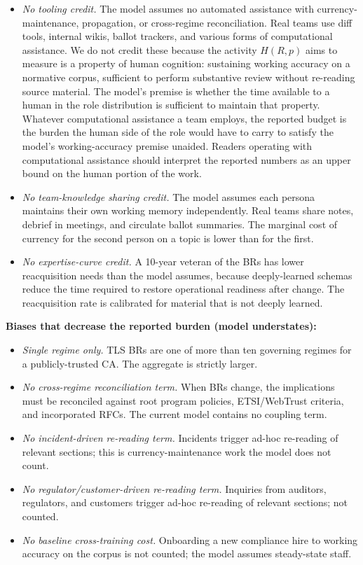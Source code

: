 \documentclass[11pt,letterpaper]{article}
\begin{document}
\begin{itemize}
\item \textit{No tooling credit.} The model assumes no automated assistance with currency-maintenance, propagation, or cross-regime reconciliation. Real teams use diff tools, internal wikis, ballot trackers, and various forms of computational assistance. We do not credit these because the activity $H(R, p)$ aims to measure is a property of human cognition: sustaining working accuracy on a normative corpus, sufficient to perform substantive review without re-reading source material. The model's premise is whether the time available to a human in the role distribution is sufficient to maintain that property. Whatever computational assistance a team employs, the reported budget is the burden the human side of the role would have to carry to satisfy the model's working-accuracy premise unaided. Readers operating with computational assistance should interpret the reported numbers as an upper bound on the human portion of the work.
\item \textit{No team-knowledge sharing credit.} The model assumes each persona maintains their own working memory independently. Real teams share notes, debrief in meetings, and circulate ballot summaries. The marginal cost of currency for the second person on a topic is lower than for the first.
\item \textit{No expertise-curve credit.} A 10-year veteran of the BRs has lower reacquisition needs than the model assumes, because deeply-learned schemas reduce the time required to restore operational readiness after change. The reacquisition rate is calibrated for material that is not deeply learned.
\end{itemize}

\textbf{Biases that decrease the reported burden (model understates):}

\begin{itemize}
\item \textit{Single regime only.} TLS BRs are one of more than ten governing regimes for a publicly-trusted CA. The aggregate is strictly larger.
\item \textit{No cross-regime reconciliation term.} When BRs change, the implications must be reconciled against root program policies, ETSI/WebTrust criteria, and incorporated RFCs. The current model contains no coupling term.
\item \textit{No incident-driven re-reading term.} Incidents trigger ad-hoc re-reading of relevant sections; this is currency-maintenance work the model does not count.
\item \textit{No regulator/customer-driven re-reading term.} Inquiries from auditors, regulators, and customers trigger ad-hoc re-reading of relevant sections; not counted.
\item \textit{No baseline cross-training cost.} Onboarding a new compliance hire to working accuracy on the corpus is not counted; the model assumes steady-state staff.
\end{itemize}
\end{document}
